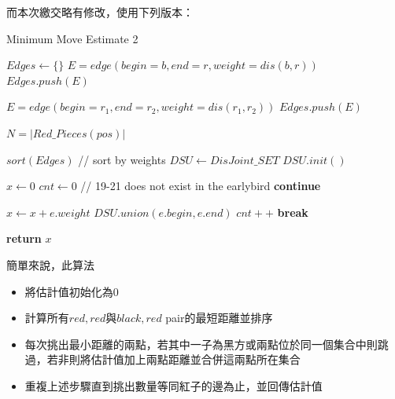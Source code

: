 \documentclass[a4paper, 12pt]{article}  %
\begin{document}
而本次繳交略有修改，使用下列版本：
\begin{algorithm}
\caption{Minimum Move Estimate 2}\label{alg:min_move_estimate2}
    \begin{algorithmic}[1] %
        \State $Edges\gets \{\}$
                    \State$E=edge(begin=b,end=r,weight=dis(b,r))$
                    \State$Edges.push( E )$
                \EndIf
            \EndFor
        \EndFor


                \State$E=edge(begin=r_1,end=r_2,weight=dis(r_1,r_2))$
                \State$Edges.push( E )$
            \EndFor
        \EndFor

        \State$N = |Red\_Pieces(pos)|$

        \State $sort(Edges)$ // sort by weights
        \State $DSU\gets DisJoint\_SET$
        \State $DSU.init()$

        \State $x\gets 0$
        \State $cnt\gets 0$
             // 19-21 does not exist in the earlybird
                    \State \textbf{continue}
                \EndIf
            \EndIf

            \State $x\gets x + e.weight$
            \State $DSU.union(e.begin, e.end)$
            \State $cnt++$
            \textbf{ break}
            \EndIf
        \EndFor

        \State\textbf{return} $x$
        \EndProcedure
    \end{algorithmic}
\end{algorithm}

\newpage
簡單來說，此算法
\begin{itemize}
    \item 將估計值初始化為$0$
    \item 計算所有$red,red$與$black, red$ pair的最短距離並排序
    \item 每次挑出最小距離的兩點，若其中一子為黑方或兩點位於同一個集合中則跳過，若非則將估計值加上兩點距離並合併這兩點所在集合
    \item 重複上述步驟直到挑出數量等同紅子的邊為止，並回傳估計值
\end{itemize}
\end{document}
